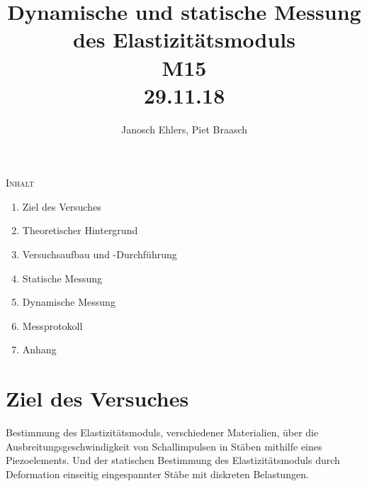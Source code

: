 \documentclass[11pt, a4paper]{article}
\begin{document}
\title{Dynamische und statische Messung des Elastizitätsmoduls\\M15\\29.11.18}
\author{Janosch Ehlers, Piet Braasch}
\maketitle

\begin{center}
\textsc{Inhalt}
\end{center}

\begin{enumerate}
\item Ziel des Versuches
\item Theoretischer Hintergrund
\item Versuchsaufbau und -Durchführung
\item Statische Messung
\item Dynamische Messung
\item Messprotokoll
\item Anhang
\end{enumerate}

\newpage
\section{Ziel des Versuches}
Bestimmung des Elastizitätsmoduls, verschiedener Materialien, über die Ausbreitungsgeschwindigkeit von Schallimpulsen in Stäben mithilfe eines Piezoelements. Und der statischen Bestimmung des Elastizitätsmoduls durch Deformation einseitig eingespannter Stäbe mit diskreten Belastungen. 
\end{document}
